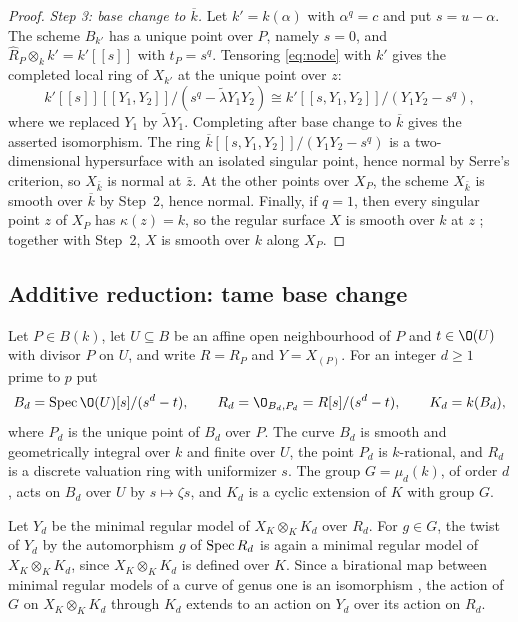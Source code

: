 \begin{proof}
\smallskip
\emph{Step 3: base change to $\overline k$.}
Let $k' = k(\alpha)$ with $\alpha^q = c$ and put $s = u-\alpha$.
The scheme $B_{k'}$ has a unique point over $P$, namely $s = 0$, and $\widehat R_P\otimes_kk' = k'[[s]]$ with $t_P = s^q$.
Tensoring \eqref{eq:node} with $k'$ gives the completed local ring of $X_{k'}$ at the unique point over $z$:
\[
  k'[[s]][[Y_1,Y_2]]/(s^q-\tilde\lambda Y_1Y_2)\cong k'[[s,Y_1,Y_2]]/(Y_1Y_2-s^q),
\]
where we replaced $Y_1$ by $\tilde\lambda Y_1$.
Completing after base change to $\overline k$ gives the asserted isomorphism.
The ring $\overline k[[s,Y_1,Y_2]]/(Y_1Y_2-s^q)$ is a two-dimensional hypersurface with an isolated singular point, hence normal by Serre's criterion, so $X_{\bar k}$ is normal at $\bar z$.
At the other points over $X_P$, the scheme $X_{\bar k}$ is smooth over $\overline k$ by Step~2, hence normal.
Finally, if $q = 1$, then every singular point $z$ of $X_P$ has $\kappa(z) = k$, so the regular surface $X$ is smooth over $k$ at $z$ \cite[Tag~]{Stacks}; together with Step~2, $X$ is smooth over $k$ along $X_P$.
\end{proof}


\subsection{Additive reduction: tame base change}
Let $P\in B(k)$, let $U\subseteq B$ be an affine open neighbourhood of $P$ and $t\in\O(U)$ with divisor $P$ on $U$, and write $R = R_P$ and $Y = X_{(P)}$.
For an integer $d\geq 1$ prime to $p$ put
\[
  B_d = \Spec\O(U)[s]/(s^d-t),\qquad R_d = \O_{B_d,P_d} = R[s]/(s^d-t),\qquad K_d = k(B_d),
\]
where $P_d$ is the unique point of $B_d$ over $P$.
The curve $B_d$ is smooth and geometrically integral over $k$ and finite over $U$, the point $P_d$ is $k$-rational, and $R_d$ is a discrete valuation ring with uniformizer $s$.
The group $G = \mu_d(k)$, of order $d$, acts on $B_d$ over $U$ by $s\mapsto\zeta s$, and $K_d$ is a cyclic extension of $K$ with group $G$.

Let $Y_d$ be the minimal regular model of $X_K\otimes_KK_d$ over $R_d$.
For $g\in G$, the twist of $Y_d$ by the automorphism $g$ of $\operatorname{Spec} R_d$ is again a minimal regular model of $X_K\otimes_KK_d$, since $X_K\otimes_KK_d$ is defined over $K$.
Since a birational map between minimal regular models of a curve of genus one is an isomorphism \cite[Definition~9.3.12 and Corollary~9.3.24]{Liu02}, the action of $G$ on $X_K\otimes_KK_d$ through $K_d$ extends to an action on $Y_d$ over its action on $R_d$.

